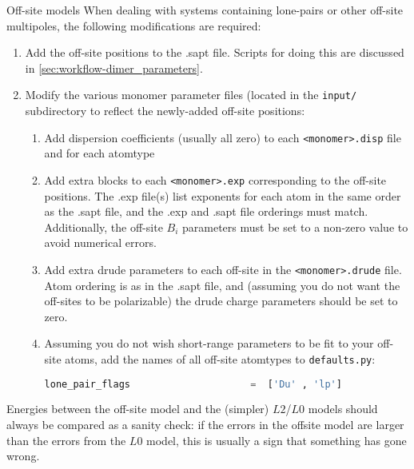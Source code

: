 \begin{paragraph}{Off-site models}
When dealing with systems containing lone-pairs or other off-site multipoles,
the following modifications are required:
\begin{enumerate}
\item Add the off-site positions to the .sapt file. Scripts for doing this are
discussed in \cref{sec:workflow-dimer_parameters}.
\item Modify the various monomer parameter files (located in the \verb|input/|
subdirectory to reflect the newly-added off-site positions:
    \begin{enumerate}
    \item Add dispersion coefficients (usually all zero) to each
            \verb|<monomer>.disp| file and for each atomtype
    \item Add extra blocks to each \verb|<monomer>.exp| corresponding to the
off-site positions. The .exp file(s) list exponents for each atom in the same
order as the .sapt file, and the .exp and .sapt file orderings must match.
Additionally, the off-site $B_i$ parameters must be set to a non-zero value to
avoid numerical errors.
    \item Add extra drude parameters to each off-site in the
\verb|<monomer>.drude| file. Atom ordering is as in the .sapt file, and
(assuming you do not want the off-sites to be polarizable) the drude charge
parameters should be set to zero.
    \item Assuming you do not wish short-range parameters to be fit to your
off-site atoms, add the names of all off-site atomtypes to \verb|defaults.py|:
\begin{lstlisting}[language=python]
lone_pair_flags                     =  ['Du' , 'lp']
\end{lstlisting}
    \end{enumerate}
\end{enumerate}
%
Energies between the off-site model and the (simpler) $L2$/$L0$ models should
always be compared as a sanity check: if the errors in the offsite model are
larger than the errors from the $L0$ model, this is usually a sign that
something has gone wrong. 
\end{paragraph}

